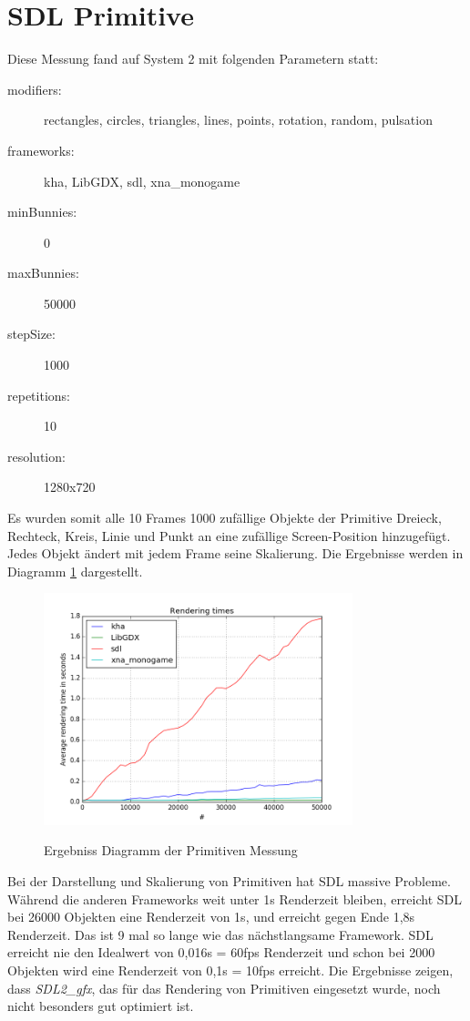\section{SDL Primitive}
Diese Messung fand auf System 2 mit folgenden Parametern statt:
\begin{description}
\item[modifiers:] rectangles, circles, triangles, lines, points, rotation, random, pulsation
\item[frameworks:] kha, LibGDX, sdl, xna\_monogame
\item[minBunnies:] 0
\item[maxBunnies:] 50000
\item[stepSize:] 1000
\item[repetitions:] 10
\item[resolution:] 1280x720
\end{description}
Es wurden somit alle 10 Frames 1000 zufällige Objekte der Primitive Dreieck, Rechteck, Kreis, Linie und Punkt an eine zufällige Screen-Position hinzugefügt. Jedes Objekt ändert mit jedem Frame seine Skalierung. Die Ergebnisse werden in Diagramm \ref{dia:sdl_primitives} dargestellt.
\begin{figure}
\caption{Ergebniss Diagramm der Primitiven Messung}
\centering
\includegraphics[width=0.8\textwidth]{sdl_primitives}
\label{dia:sdl_primitives}
\end{figure}
Bei der Darstellung und Skalierung von Primitiven hat SDL massive Probleme. Während die anderen Frameworks weit unter 1s Renderzeit bleiben, erreicht SDL bei 26000 Objekten eine Renderzeit von 1s, und erreicht gegen Ende 1,8s Renderzeit. Das ist 9 mal so lange wie das nächstlangsame Framework. SDL erreicht nie den Idealwert von 0,016s = 60fps Renderzeit und schon bei 2000 Objekten wird eine Renderzeit von 0,1s = 10fps erreicht. Die Ergebnisse zeigen, dass \textit{SDL2\_gfx}, das für das Rendering von Primitiven eingesetzt wurde, noch nicht besonders gut optimiert ist.
\\
\\
\\

